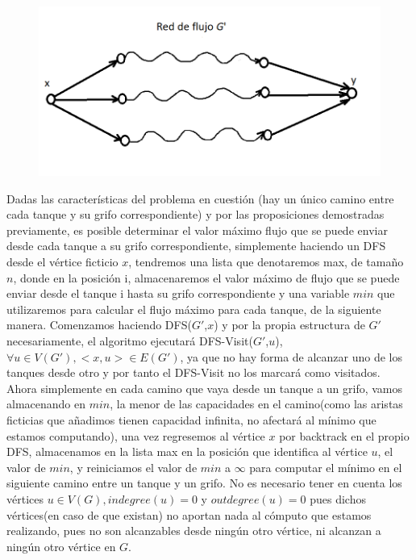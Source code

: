 \documentclass{article}
\begin{document}
    \begin{figure}[h]
        \includegraphics[scale = 0.5]{img/Image2Problem1.png}
        \centering
    \end{figure}

    Dadas las caracter\'isticas del problema en cuesti\'on (hay un \'unico camino entre cada tanque y su grifo correspondiente) y por las proposiciones demostradas previamente, 
    es posible determinar el valor m\'aximo flujo que se puede enviar desde cada tanque a su grifo correspondiente, 
    simplemente haciendo un DFS desde el v\'ertice ficticio $x$, tendremos una lista que denotaremos max, de tama\~no $n$, donde en la posici\'on i, almacenaremos el valor 
    m\'aximo de flujo que se puede enviar desde el tanque i hasta su grifo correspondiente y una variable $min$ que utilizaremos para calcular el flujo m\'aximo para cada 
    tanque, de la siguiente manera. Comenzamos haciendo DFS($G'$,$x$) y por la propia estructura de $G'$ necesariamente, el algoritmo ejecutar\'a DFS-Visit($G'$,$u$), 
    $\forall u \in V(G'), <x,u> \in E(G')$, ya que no hay forma de alcanzar uno de los tanques desde otro y por tanto el DFS-Visit no los marcar\'a como visitados. Ahora simplemente
    en cada camino que vaya desde un tanque a un grifo, vamos almacenando en $min$, la menor de las capacidades en el camino(como las aristas ficticias que a\~nadimos tienen 
    capacidad infinita, no afectar\'a al m\'inimo que estamos computando), una vez regresemos al v\'ertice $x$ por backtrack en el propio DFS, almacenamos en la lista max en la posici\'on 
    que identifica al v\'ertice $u$, el valor de $min$, y reiniciamos el valor de $min$ a $\infty$ para computar el m\'inimo en el siguiente camino entre un tanque y un grifo. No es necesario
    tener en cuenta los v\'ertices $u \in V(G), indegree(u) = 0$ y $outdegree(u) = 0$ pues dichos v\'ertices(en caso de que existan) no aportan nada al c\'omputo que estamos realizando, pues no son 
    alcanzables desde ning\'un otro v\'ertice, ni alcanzan a ning\'un otro v\'ertice en $G$.\\\\ 
\end{document}
